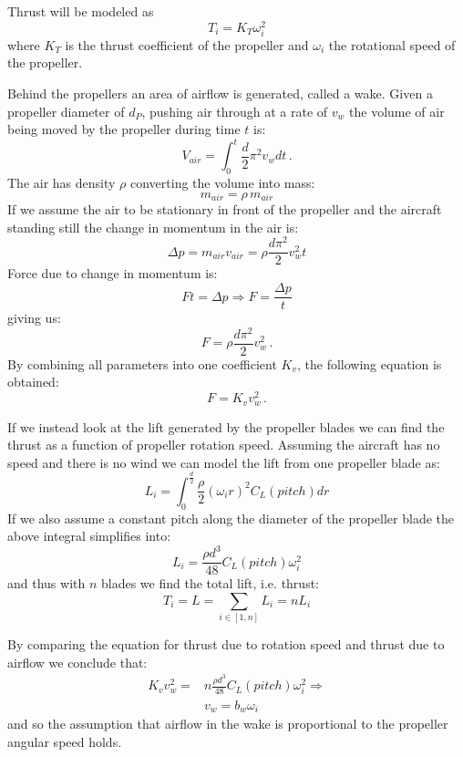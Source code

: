 Thrust will be modeled as
\begin{equation}
    T_i = K_T \omega_i^2
\end{equation}
where $K_T$ is the thrust coefficient of the propeller and $\omega_i$ the rotational speed of the propeller.

Behind the propellers an area of airflow is generated, called a wake.
Given a propeller diameter of $d_P$, pushing air through at a rate of $v_w$ the volume of air being moved by the propeller during time $t$ is:
\begin{equation}
	V_{air} = \int_0^t \frac{d}{2} \pi^2 v_w dt \,.
\end{equation}
The air has density $\rho$ converting the volume into mass:
\begin{equation}
	m_{air} = \rho \, m_{air}
\end{equation}
If we assume the air to be stationary in front of the propeller and the aircraft standing still the change in momentum in the air is:
\begin{equation}
	\Delta p = m_{air} v_{air} = \rho \frac{d \pi^2}{2} v_w^2 t
\end{equation}
Force due to change in momentum is:
\begin{equation}
	F t = \Delta p \Rightarrow F = \frac{\Delta p}{t}
\end{equation}
giving us:
\begin{equation}
	F = \rho  \frac{d \pi^2}{2} v_w^2 \, .
\end{equation}
By combining all parameters into one coefficient $K_v$, the following equation is obtained:
\begin{equation}
	F = K_v  v_w^2 \, .
\end{equation}

If we instead look at the lift generated by the propeller blades we can find the thrust as a function of propeller rotation speed.
Assuming the aircraft has no speed and there is no wind we can model the lift from one propeller blade as:
\begin{equation}
	L_i = \int_0^{\frac{d}{2}} \frac{\rho}{2} (\omega_i r)^2 C_L(pitch) dr
\end{equation}
If we also assume a constant pitch along the diameter of the propeller blade the above integral simplifies into:
\begin{equation}
	L_i = \frac{\rho d^3}{48} C_L(pitch) \omega_i^2
\end{equation}
and thus with $n$ blades we find the total lift, i.e. thrust:
\begin{equation}
	T_i = L = \sum_{i \in [1,n]} L_i = n L_i
\end{equation}

By comparing the equation for thrust due to rotation speed and thrust due to airflow we conclude that:
\begin{equation} \begin{split}
	K_v v_w^2 =& n \frac{\rho d^3}{48} C_L(pitch) \omega_i^2 \Rightarrow \\
	& v_w = b_w \omega_i
\end{split}\end{equation}
and so the assumption that airflow in the wake is proportional to the propeller angular speed holds.

